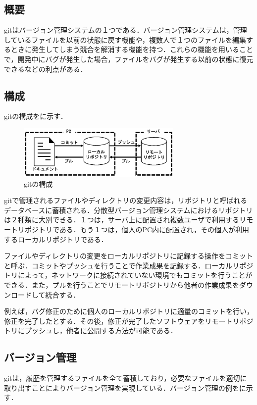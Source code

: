 \documentclass[a4j,9pt,twocolumn]{jsarticle}
\begin{document}
\subsection{概要}
gitはバージョン管理システムの１つである．バージョン管理システムは，管理しているファイルを以前の状態に戻す機能や，複数人で１つのファイルを編集するときに発生してしまう競合を解消する機能を持つ．これらの機能を用いることで，開発中にバグが発生した場合，ファイルをバグが発生する以前の状態に復元できるなどの利点がある\cite{pop}．

\subsection{構成}
gitの構成をに示す．

\begin{figure}[h]
\centering
\includegraphics[width=80mm]{img/git.eps}
\caption{gitの構成}
\label{git}
\end{figure}

gitで管理されるファイルやディレクトリの変更内容は，リポジトリと呼ばれるデータベースに蓄積される．分散型バージョン管理システムにおけるリポジトリは２種類に大別できる．１つは，サーバ上に配置され複数ユーザで利用するリモートリポジトリである．もう１つは，個人のPC内に配置され，その個人が利用するローカルリポジトリである．

ファイルやディレクトリの変更をローカルリポジトリに記録する操作をコミットと呼ぶ．コミットやプッシュを行うことで作業成果を記録する．ローカルリポジトリによって，ネットワークに接続されていない環境でもコミットを行うことができる．また，プルを行うことでリモートリポジトリから他者の作業成果をダウンロードして統合する．

例えば，バグ修正のために個人のローカルリポジトリに適量のコミットを行い，修正を完了したとする．その後，修正が完了したソフトウェアをリモートリポジトリにプッシュし，他者に公開する方法が可能である．

\subsection{バージョン管理}
gitは，履歴を管理するファイルを全て蓄積しており，必要なファイルを適切に取り出すことによりバージョン管理を実現している．バージョン管理の例をに示す．
\end{document}
